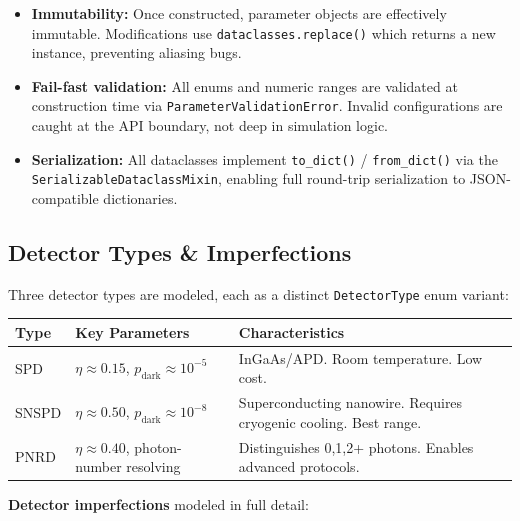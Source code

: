 \documentclass[11pt,a4paper,oneside]{report}
\begin{document}
\begin{itemize}
\item \textbf{Immutability:} Once constructed, parameter objects are effectively immutable. Modifications use \texttt{dataclasses.replace()} which returns a new instance, preventing aliasing bugs.
\item \textbf{Fail-fast validation:} All enums and numeric ranges are validated at construction time via \texttt{ParameterValidationError}. Invalid configurations are caught at the API boundary, not deep in simulation logic.
\item \textbf{Serialization:} All dataclasses implement \texttt{to\_dict()} / \texttt{from\_dict()} via the \texttt{SerializableDataclassMixin}, enabling full round-trip serialization to JSON-compatible dictionaries.
\end{itemize}

\subsection{Detector Types \& Imperfections}

Three detector types are modeled, each as a distinct \texttt{DetectorType} enum variant:

\begin{center}
\begin{tabular}{@{}lp{4cm}p{4.5cm}@{}}
\toprule
\textbf{Type} & \textbf{Key Parameters} & \textbf{Characteristics} \\
\midrule
SPD & $\eta \approx 0.15$, $p_{\text{dark}} \approx 10^{-5}$ & InGaAs/APD. Room temperature. Low cost. \\
SNSPD & $\eta \approx 0.50$, $p_{\text{dark}} \approx 10^{-8}$ & Superconducting nanowire. Requires cryogenic cooling. Best range. \\
PNRD & $\eta \approx 0.40$, photon-number resolving & Distinguishes 0,1,2+ photons. Enables advanced protocols. \\
\bottomrule
\end{tabular}
\end{center}

\textbf{Detector imperfections} modeled in full detail:
\end{document}
